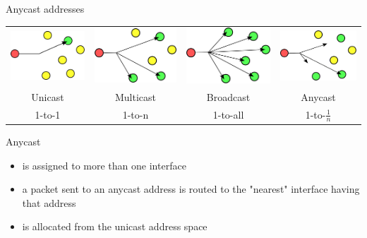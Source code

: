 \begin{frame}{Anycast addresses}
  \begin{tabular}{cccc}
    \includegraphics[width=.2\columnwidth]{unicast}&
    \includegraphics[width=.2\columnwidth]{multicast}&
    \includegraphics[width=.2\columnwidth]{broadcast}&
    \includegraphics[width=.2\columnwidth]{anycast}\\
    Unicast&Multicast&Broadcast&Anycast\\
    1-to-1&1-to-n&1-to-all&1-to-$\frac{1}{n}$\\
  \end{tabular}
  \begin{block}{Anycast}
    \begin{itemize}
    \item is assigned to more than one interface
    \item a packet sent to an anycast address is routed to the "nearest" interface having
      that address
    \item is allocated from the unicast address space
    \end{itemize}
  \end{block}
\end{frame}


